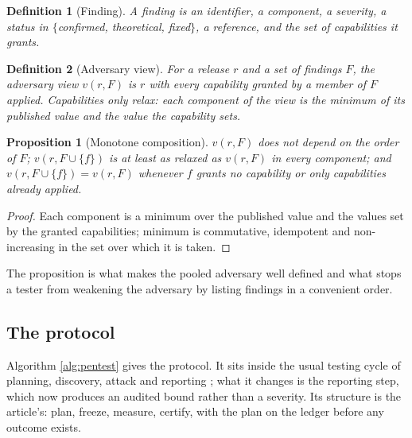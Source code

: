 \documentclass[11pt,a4paper]{article}
\newtheorem{definition}{Definition}
\newtheorem{proposition}{Proposition}
\begin{document}
\begin{definition}[Finding]
A finding is an identifier, a component, a severity, a status in $\{$confirmed, theoretical, fixed$\}$, a reference, and the set of capabilities it grants.
\end{definition}

\begin{definition}[Adversary view]
For a release $r$ and a set of findings $F$, the adversary view $v(r,F)$ is $r$ with every capability granted by a member of $F$ applied. Capabilities only relax: each component of the view is the minimum of its published value and the value the capability sets.
\end{definition}

\begin{proposition}[Monotone composition]
$v(r,F)$ does not depend on the order of $F$; $v(r,F\cup\{f\})$ is at least as relaxed as $v(r,F)$ in every component; and $v(r,F\cup\{f\})=v(r,F)$ whenever $f$ grants no capability or only capabilities already applied.
\end{proposition}
\begin{proof}
Each component is a minimum over the published value and the values set by the granted capabilities; minimum is commutative, idempotent and non-increasing in the set over which it is taken.
\end{proof}

The proposition is what makes the pooled adversary well defined and what stops a tester from weakening the adversary by listing findings in a convenient order.

\subsection{The protocol}
Algorithm \ref{alg:pentest} gives the protocol. It sits inside the usual testing cycle of planning, discovery, attack and reporting \citep{nist800115}; what it changes is the reporting step, which now produces an audited bound rather than a severity. Its structure is the article's: plan, freeze, measure, certify, with the plan on the ledger before any outcome exists.
\end{document}
